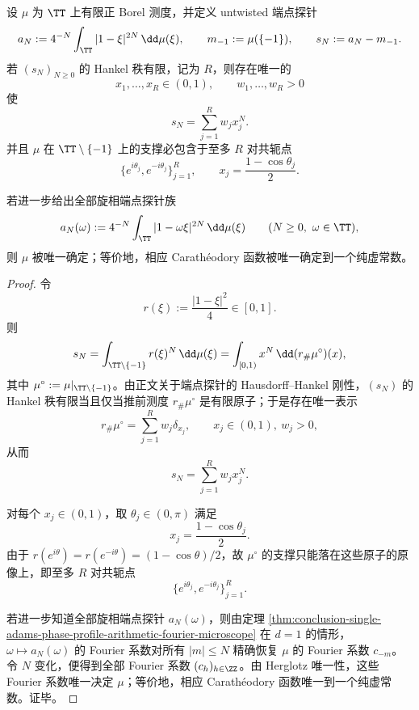 \begin{theorem}[有限秩端点探针的完全标量刚性]\label{thm:conclusion-finite-rank-endpoint-probe-complete-scalar-rigidity}
设 \(\mu\) 为 \(\TT\) 上有限正 Borel 测度，并定义 untwisted 端点探针
\[
a_N:=4^{-N}\int_{\TT}|1-\xi|^{2N}\,\dd\mu(\xi),
\qquad
m_{-1}:=\mu(\{-1\}),
\qquad
s_N:=a_N-m_{-1}.
\]
若 \((s_N)_{N\ge 0}\) 的 Hankel 秩有限，记为 \(R\)，则存在唯一的
\[
x_1,\dots,x_R\in(0,1),
\qquad
w_1,\dots,w_R>0
\]
使
\[
s_N=\sum_{j=1}^{R}w_jx_j^N.
\]
并且 \(\mu\) 在 \(\TT\setminus\{-1\}\) 上的支撑必包含于至多 \(R\) 对共轭点
\[
\{e^{i\theta_j},e^{-i\theta_j}\}_{j=1}^{R},
\qquad
x_j=\frac{1-\cos\theta_j}{2}.
\]

若进一步给出全部旋相端点探针族
\[
a_N(\omega):=
4^{-N}\int_{\TT}|1-\omega\xi|^{2N}\,\dd\mu(\xi)
\qquad (N\ge0,\ \omega\in\TT),
\]
则 \(\mu\) 被唯一确定；等价地，相应 Carath\'eodory 函数被唯一确定到一个纯虚常数。
\end{theorem}
\begin{proof}
令
\[
r(\xi):=\frac{|1-\xi|^2}{4}\in[0,1].
\]
则
\[
s_N
=
\int_{\TT\setminus\{-1\}} r(\xi)^N\,\dd\mu(\xi)
=
\int_{[0,1)}x^N\,\dd(r_\#\mu^\circ)(x),
\]
其中 \(\mu^\circ:=\mu|_{\TT\setminus\{-1\}}\)。由正文关于端点探针的 Hausdorff--Hankel 刚性，\((s_N)\) 的 Hankel 秩有限当且仅当推前测度 \(r_\#\mu^\circ\) 是有限原子；于是存在唯一表示
\[
r_\#\mu^\circ=\sum_{j=1}^{R}w_j\delta_{x_j},
\qquad
x_j\in(0,1),\ w_j>0,
\]
从而
\[
s_N=\sum_{j=1}^{R}w_jx_j^N.
\]

对每个 \(x_j\in(0,1)\)，取 \(\theta_j\in(0,\pi)\) 满足
\[
x_j=\frac{1-\cos\theta_j}{2}.
\]
由于 \(r(e^{i\theta})=r(e^{-i\theta})=(1-\cos\theta)/2\)，故 \(\mu^\circ\) 的支撑只能落在这些原子的原像上，即至多 \(R\) 对共轭点
\[
\{e^{i\theta_j},e^{-i\theta_j}\}_{j=1}^{R}.
\]

若进一步知道全部旋相端点探针 \(a_N(\omega)\)，则由定理 \ref{thm:conclusion-single-adams-phase-profile-arithmetic-fourier-microscope} 在 \(d=1\) 的情形，\(\omega\mapsto a_N(\omega)\) 的 Fourier 系数对所有 \(|m|\le N\) 精确恢复 \(\mu\) 的 Fourier 系数 \(c_{-m}\)。令 \(N\) 变化，便得到全部 Fourier 系数 \((c_h)_{h\in\ZZ}\)。由 Herglotz 唯一性，这些 Fourier 系数唯一决定 \(\mu\)；等价地，相应 Carath\'eodory 函数唯一到一个纯虚常数。证毕。
\end{proof}

